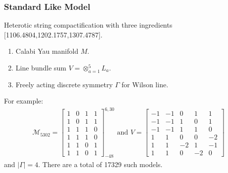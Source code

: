 \documentclass{beamer}
\begin{document}
\begin{frame}
\frametitle{Standard Like Model}
Heterotic string compactification with three ingredients {\color{blue} [1106.4804,1202.1757,1307.4787]}.
\begin{enumerate}
\item Calabi Yau manifold $M$. \item Line bundle sum $V = \otimes_{a=1}^5 L_a$. \item Freely acting discrete symmetry $\Gamma$ for Wilson line.
\end{enumerate}
For example:
\begin{align}
	\mathcal{M}_{5302} =  \left[
	\begin{array}{c||ccc}
	1 & 0 & 1 & 1 \\
	1 & 0 & 1 & 1 \\
	1 & 1 & 1 & 0 \\
	1 & 1 & 1 & 0 \\
	1 & 1 & 0 & 1 \\
	1 & 1 & 0 & 1
	\end{array}
	\right]^{6,30}_{-48} \text{ and }  V = \left[\begin{array}{ccccc}
	-1 & -1 & 0 & 1 & 1 \\
	-1& -1&  1&  0&  1\\
	-1& -1&  1&  1&  0\\
	1& 1&  0&  0& -2\\
	1& 1&  -2&  1&  -1\\
	1& 1&  0&  -2&  0
	\end{array}\right]\nonumber 
\end{align}
and $|\Gamma| = 4$. There are a total of 17329 such models.
\end{frame}
\end{document}
